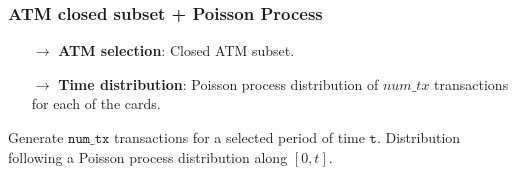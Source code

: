 \documentclass{article}
\begin{document}
\subsubsection{ATM closed subset + Poisson Process}

\begin{tcolorbox}
  \begin{itemize}
    \item[$\rightarrow$] \textbf{ATM selection}: Closed ATM subset.
    \item[$\rightarrow$] \textbf{Time distribution}: Poisson process distribution of $num\_tx$ 
    transactions for each of the cards.
  \end{itemize}
\end{tcolorbox}

Generate $\texttt{num\_tx}$ transactions for a selected period of time $\texttt{t}$.
Distribution following a Poisson process distribution along $[0,t]$.
\end{document}
